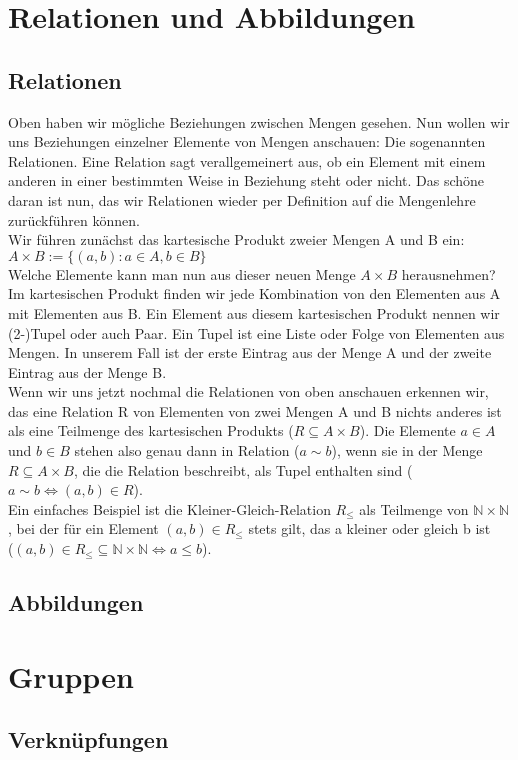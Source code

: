 \documentclass[parskip=full]{scrartcl}
\begin{document}
\section{Relationen und Abbildungen}
    \subsection{Relationen}
        Oben haben wir mögliche Beziehungen zwischen Mengen gesehen.
        Nun wollen wir uns Beziehungen einzelner Elemente von Mengen anschauen: Die sogenannten Relationen.
        Eine Relation sagt verallgemeinert aus, ob ein Element mit einem anderen in einer bestimmten Weise in Beziehung steht oder nicht.
        Das schöne daran ist nun, das wir Relationen wieder per Definition auf die Mengenlehre zurückführen können.
        \\Wir führen zunächst das kartesische Produkt zweier Mengen A und B ein:
        \\\quad\(A \times B := \{(a, b) : a \in A, b \in B\}\)
        \\Welche Elemente kann man nun aus dieser neuen Menge \(A \times B\) herausnehmen?
        Im kartesischen Produkt finden wir jede Kombination von den Elementen aus A mit Elementen aus B.
        Ein Element aus diesem kartesischen Produkt nennen wir (2-)Tupel oder auch Paar. 
        Ein Tupel ist eine Liste oder Folge von Elementen aus Mengen. 
        In unserem Fall ist der erste Eintrag aus der Menge A und der zweite Eintrag aus der Menge B.
        \\Wenn wir uns jetzt nochmal die Relationen von oben anschauen erkennen wir, 
        das eine Relation R von Elementen von zwei Mengen A und B nichts anderes ist als eine Teilmenge des kartesischen Produkts
        (\(R \subseteq A \times B\)).
        Die Elemente \(a \in A\) und \(b \in B\) stehen also genau dann in Relation (\(a \sim b\)), 
        wenn sie in der Menge \(R \subseteq A \times B\), die die Relation beschreibt, als Tupel enthalten sind
        (\(a \sim b \iff (a, b) \in R\)).
        \\Ein einfaches Beispiel ist die Kleiner-Gleich-Relation \(R_\leq\) als Teilmenge von \(\mathbb{N} \times \mathbb{N}\), 
        bei der für ein Element \((a, b) \in R_\leq\) stets gilt, das a kleiner oder gleich b ist 
        \\(\((a, b) \in R_\leq \subseteq \mathbb{N} \times \mathbb{N} \iff a \leq b\)). 

    \subsection{Abbildungen}

\section{Gruppen}
    \subsection{Verknüpfungen}
\end{document}
